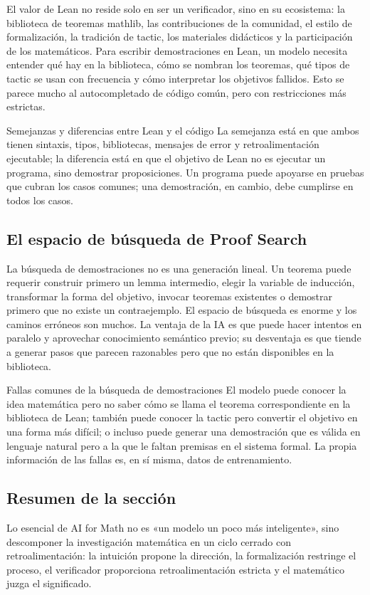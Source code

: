 El valor de Lean no reside solo en ser un verificador, sino en su ecosistema: la biblioteca de teoremas mathlib, las contribuciones de la comunidad, el estilo de formalización, la tradición de tactic, los materiales didácticos y la participación de los matemáticos. Para escribir demostraciones en Lean, un modelo necesita entender qué hay en la biblioteca, cómo se nombran los teoremas, qué tipos de tactic se usan con frecuencia y cómo interpretar los objetivos fallidos. Esto se parece mucho al autocompletado de código común, pero con restricciones más estrictas.

\begin{knowledgebox}{Semejanzas y diferencias entre Lean y el código}
La semejanza está en que ambos tienen sintaxis, tipos, bibliotecas, mensajes de error y retroalimentación ejecutable; la diferencia está en que el objetivo de Lean no es ejecutar un programa, sino demostrar proposiciones. Un programa puede apoyarse en pruebas que cubran los casos comunes; una demostración, en cambio, debe cumplirse en todos los casos.
\end{knowledgebox}

\subsection{El espacio de búsqueda de Proof Search}

La búsqueda de demostraciones no es una generación lineal. Un teorema puede requerir construir primero un lemma intermedio, elegir la variable de inducción, transformar la forma del objetivo, invocar teoremas existentes o demostrar primero que no existe un contraejemplo. El espacio de búsqueda es enorme y los caminos erróneos son muchos. La ventaja de la IA es que puede hacer intentos en paralelo y aprovechar conocimiento semántico previo; su desventaja es que tiende a generar pasos que parecen razonables pero que no están disponibles en la biblioteca.

\begin{warningbox}{Fallas comunes de la búsqueda de demostraciones}
El modelo puede conocer la idea matemática pero no saber cómo se llama el teorema correspondiente en la biblioteca de Lean; también puede conocer la tactic pero convertir el objetivo en una forma más difícil; o incluso puede generar una demostración que es válida en lenguaje natural pero a la que le faltan premisas en el sistema formal. La propia información de las fallas es, en sí misma, datos de entrenamiento.
\end{warningbox}

\subsection{Resumen de la sección}

Lo esencial de AI for Math no es «un modelo un poco más inteligente», sino descomponer la investigación matemática en un ciclo cerrado con retroalimentación: la intuición propone la dirección, la formalización restringe el proceso, el verificador proporciona retroalimentación estricta y el matemático juzga el significado.
